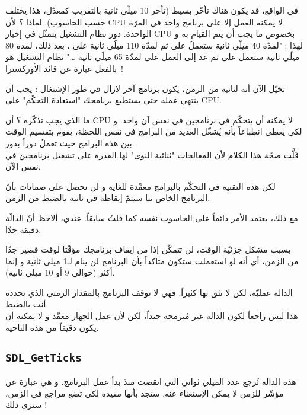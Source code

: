 في الواقع، قد يكون هناك تأخّر بسيط (تأخر 10 ميلّي ثانية بالتقريب كمعدّل، هذا يختلف حسب الحاسوب). لماذا ؟ لأن
\textenglish{CPU}
لا يمكنه العمل إلا على برنامج واحد في المرّة الواحدة. دور نظام التشغيل يتمثّل في إخبار
\textenglish{CPU}
بخصوص ما يجب أن يتم القيام به و لهذا : "لمدّة 40 ميلّي ثانية ستعملُ على
ثم لمدّة 110 ميلّي ثانية على 
،
بعد ذلك، لمدة 80 ميلّي ثانية ستعمل على
ثم عد إلى العمل على
لمدّة 65 ميلّي ثانية
\dots"
نظام التشغيل هو بالفعل عبارة عن قائد الأوركسترا~!

تخيّل الآن أنه لثانية من الزمن، يكون برنامج آخر لازال في طور الإشتغال : يجب أن ينتهي عمله حتى يستطيع برنامجك "استعادة التحكّم" على
\textenglish{CPU}.

ما الذي يجب تذكّره ؟ أن
\textenglish{CPU}
لا يمكنه أن يتحكّم في برنامجين في نفس آن واحد. و لكي يعطي انطباعاً بأنه يُشغّل العديد من البرامج في نفس اللحظة، يقوم بتقسيم الوقت بين هذه البرامج حيث تعملُ دوراً بدور.\\
قَلَّت صحّة هذا الكلام لأن المعالجات "ثنائية النوى" لها القدرة على تشغيل برنامجين في نفس الآن. 

لكن هذه التقنية في التحكّم بالبرامج معقّدة للغاية و لن نحصل على ضمانات بأنّ البرنامج الخاص بنا سيتمّ إيقاظة في ثانية بالضبط من الزمن.

مع ذلك، يعتمد الأمر دائماً على الحاسوب نفسه كما قلتُ سابقاً. عندي، ألاحظ أنّ الدالّة
دقيقة جدّا.
\begin{information}
 بسبب مشكل جزئيّة الوقت، لن تتمكّن إذا من إيقاف برنامجك مؤقّتا لوقت قصير جدّا من الزمن، أي أنه لو استعملت 
ستكون متأكداً بأن البرنامج لن ينام لـ1 ميلي ثانية و إنما أكثر (حوالي 9 أو 10 ميلي ثانية).
\end{information}

الدالة
عمليّة، لكن لا تثق بها كثيراً. فهي لا توقف البرنامج بالمقدار الزمني الذي تحدده أنت بالضبط. \\
هذا ليس راجعاً لكون الدالة غير مُبرمجة جيداً، لكن لأن عمل الجهاز معقّد و لا يمكنه أن يكون دقيقاً من هذه الناحية.

\subsection{\texttt{SDL\_GetTicks}}

هذه الدالة تُرجع عدد الميلي ثواني التي انقضت منذ بدأ عمل البرنامج. و هي عبارة عن مؤشّر للزمن لا يمكن الإستغناء عنه. ستجد بأنها مفيدة لكي تضع مراجع في الزمن، سترى ذلك !


